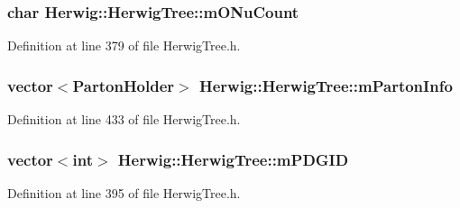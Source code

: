 \subsubsection[{\texorpdfstring{m\+O\+Nu\+Count}{mONuCount}}]{\setlength{\rightskip}{0pt plus 5cm}char Herwig\+::\+Herwig\+Tree\+::m\+O\+Nu\+Count\hspace{0.3cm}{\ttfamily [protected]}}\hypertarget{class_herwig_1_1_herwig_tree_a28df6b8b7b033370f9817f3e055fbb44}{}\label{class_herwig_1_1_herwig_tree_a28df6b8b7b033370f9817f3e055fbb44}


Definition at line 379 of file Herwig\+Tree.\+h.

\subsubsection[{\texorpdfstring{m\+Parton\+Info}{mPartonInfo}}]{\setlength{\rightskip}{0pt plus 5cm}vector$<${\bf Parton\+Holder}$>$ Herwig\+::\+Herwig\+Tree\+::m\+Parton\+Info\hspace{0.3cm}{\ttfamily [protected]}}\hypertarget{class_herwig_1_1_herwig_tree_aea4b92ced12093c2e65c97bfe3a0a839}{}\label{class_herwig_1_1_herwig_tree_aea4b92ced12093c2e65c97bfe3a0a839}


Definition at line 433 of file Herwig\+Tree.\+h.

\subsubsection[{\texorpdfstring{m\+P\+D\+G\+ID}{mPDGID}}]{\setlength{\rightskip}{0pt plus 5cm}vector$<$int$>$ Herwig\+::\+Herwig\+Tree\+::m\+P\+D\+G\+ID\hspace{0.3cm}{\ttfamily [protected]}}\hypertarget{class_herwig_1_1_herwig_tree_ab6991935c69e5fb1f0e03e9e8e22fdd6}{}\label{class_herwig_1_1_herwig_tree_ab6991935c69e5fb1f0e03e9e8e22fdd6}


Definition at line 395 of file Herwig\+Tree.\+h.

